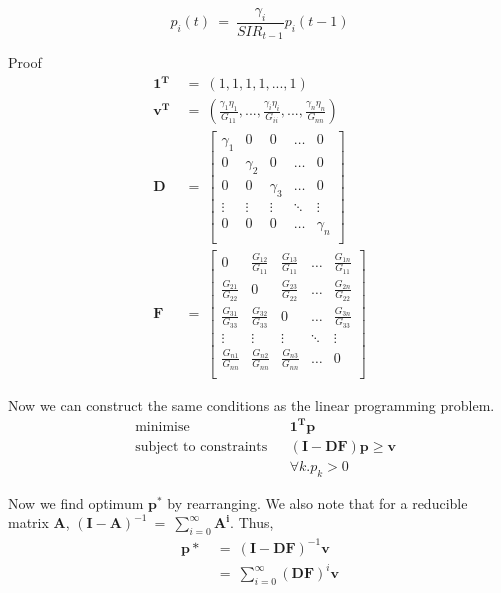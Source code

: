 \documentclass[a4paper]{article}
\begin{document}
$$p_i(t)\ =\ \frac{\gamma_i}{SIR_{t-1}}p_i(t-1)$$

Proof
\begin{align*}
	\mathbf{1^T}\ &=\ (1, 1, 1, 1, ..., 1)\\
	\mathbf{v^T}\ &=\ (\frac{\gamma_1\eta_1}{G_{11}},...,\frac{\gamma_i\eta_i}{G_{ii}},...,\frac{\gamma_n\eta_n}{G_{nn}}) \\
	\mathbf{D}\ &=\ 
	\begin{bmatrix}
		\gamma_1 & 0 & 0 & \dots & 0 \\
		0 & \gamma_2 & 0 & \dots & 0 \\
		0 & 0 & \gamma_3 & \dots & 0 \\
		\vdots & \vdots & \vdots & \ddots & \vdots \\
		0 & 0 & 0 & \dots & \gamma_n \\
	\end{bmatrix} \\
	\mathbf{F}\ &=\ 
	\begin{bmatrix}
	0 & \frac{G_{12}}{G_{11}}& \frac{G_{13}}{G_{11}} & \dots & \frac{G_{1n}}{G_{11}} \\
	\frac{G_{21}}{G_{22}} & 0 &\frac{G_{23}}{G_{22}} & \dots & \frac{G_{2n}}{G_{22}} \\
	\frac{G_{31}}{G_{33}} & \frac{G_{32}}{G_{33}}& 0 & \dots & \frac{G_{3n}}{G_{33}} \\
	\vdots & \vdots & \vdots & \ddots & \vdots \\
	\frac{G_{n1}}{G_{nn}} & \frac{G_{n2}}{G_{nn}} & \frac{G_{n3}}{G_{nn}} & \dots & 0 \\
	\end{bmatrix}
\end{align*}

Now we can construct the same conditions as the linear programming problem.
\begin{align*}
	& \text{minimise} && \mathbf{1^Tp} \\
	& \text{subject to constraints} && (\mathbf{I}-\mathbf{DF})\mathbf{p} \geq \mathbf{v} \\
	& && \forall k.p_k > 0 
\end{align*}

Now we find optimum $\mathbf{p^*}$ by rearranging. We also note that for a reducible matrix $\mathbf{A}$, $(\mathbf{I}-\mathbf{A})^{-1}\ =\ \sum\limits_{i=0}^{\infty}\mathbf{A^i}$. Thus,
\begin{align*}
		\mathbf{p*}\ &=\ (\mathbf{I}-\mathbf{DF})^{-1}\mathbf{v} \\
		&=\ \sum\limits_{i=0}^{\infty}(\mathbf{DF})^i\mathbf{v}
\end{align*}
\end{document}
